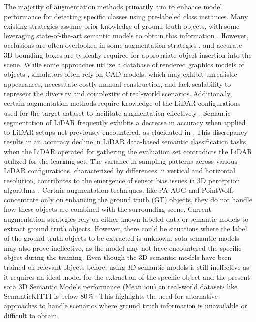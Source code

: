 The majority of augmentation methods primarily aim to enhance model performance for detecting specific classes using pre-labeled class instances. Many existing strategies assume prior knowledge of ground truth objects, with some leveraging state-of-the-art semantic models to obtain this information \parencite{rs_aug_2023}. However, occlusions are often overlooked in some augmentation strategies \parencite{second2018, xiao2022polarmix}, and accurate 3D bounding boxes are typically required for appropriate object insertion into the scene. While some approaches utilize a database of rendered graphics models of objects \parencite{second2018, rs_aug_2023}, simulators often rely on CAD models, which may exhibit unrealistic appearances, necessitate costly manual construction, and lack scalability to represent the diversity and complexity of real-world scenarios. Additionally, certain augmentation methods require knowledge of the LiDAR configurations used for the target dataset to facilitate augmentation effectively \parencite{9811816, dada_2023}. 
Semantic segmentation of LiDAR frequently exhibits a decrease in accuracy when applied to LiDAR setups not previously encountered, as elucidated in \parencite{10204248}. This discrepancy results in an accuracy decline in LiDAR data-based semantic classification tasks when the LiDAR operated for gathering the evaluation set contradicts the LiDAR utilized for the learning set. The variance in sampling patterns across various LiDAR configurations, characterized by differences in vertical and horizontal resolution, contributes to the emergence of sensor bias issues in 3D perception algorithms \parencite{survery_domain_adp_2021, domain_adp_appr_2020}. 
Certain augmentation techniques, like PA-AUG and PointWolf, concentrate only on enhancing the ground truth (GT) objects, they do not handle how these objects are combined with the surrounding scene. 
Current augmentation strategies rely on either known labeled data or semantic models to extract ground truth objects. However, there could be situations where the label of the ground truth objects to be extracted is unknown. \acrshort{sota} semantic models may also prove ineffective, as the model may not have encountered the specific object during the training.
Even though the 3D semantic models have been trained on relevant objects before, using 3D semantic models is still ineffective as it requires an ideal model for the extraction of the specific object and the present \acrshort{sota} 3D Semantic Models performance (Mean \acrshort{iou}) on real-world datasets like SemanticKITTI is below 80\% \parencite{papers-with-code}.
This highlights the need for alternative approaches to handle scenarios where ground truth information is unavailable or difficult to obtain.

